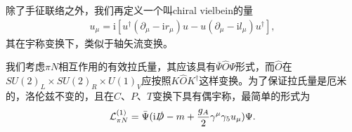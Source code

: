 \documentclass[aps,tightenlines,16pt]{ctexart}
\numberwithin{equation}{section}
\newcommand{\mL}{\mathcal{L}}
\begin{document}
除了手征联络之外，我们再定义一个叫chiral vielbein的量
\begin{align}
   u_{\mu}=\mbox{i}[u^{\dagger}(\partial_{\mu}-\mbox{i}r_{\mu})u-u(\partial_{\mu}-\mbox{i}l_{\mu})u^{\dagger}],
\end{align}
其在宇称变换下，类似于轴矢流变换。

我们考虑$\pi N$相互作用的有效拉氏量，其应该具有$\bar{\Psi}\hat{O}\Psi$形式，而$\hat{O}$在$SU(2)_L\times SU(2)_R \times U(1)_V$应按照$K\hat{O}K^{\dagger}$这样变换。为了保证拉氏量是厄米的，洛伦兹不变的，且在$C\text{、}P\text{、}T$变换下具有偶宇称，最简单的形式为
\begin{align}
   \mL_{\pi N}^{(1)} = \bar{\Psi}(\mbox{i}\slashed{D}-m+\frac{g_A}{2}\gamma^{\mu}\gamma_5u_{\mu})\Psi.
\end{align}











\newpage 

\renewcommand\refname{参考文献}




\end{document}
